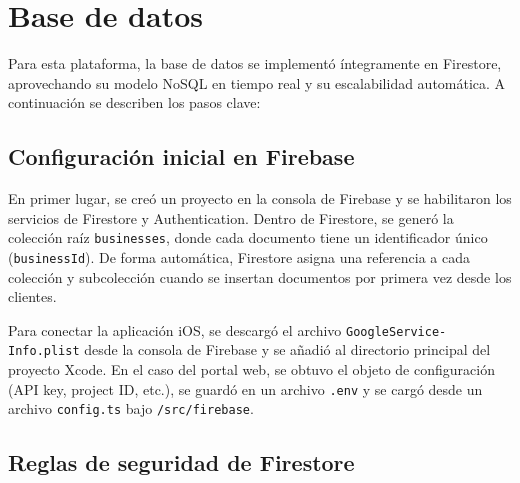 
\section{Base de datos}

\begin{large}

Para esta plataforma, la base de datos se implementó íntegramente en Firestore, aprovechando su modelo NoSQL en tiempo real y su escalabilidad automática. A continuación se describen los pasos clave:

\end{large}

\subsection{Configuración inicial en Firebase}

\begin{large}

En primer lugar, se creó un proyecto en la consola de Firebase y se habilitaron los servicios de Firestore y Authentication. Dentro de Firestore, se generó la colección raíz \texttt{businesses}, donde cada documento tiene un identificador único (\texttt{businessId}). De forma automática, Firestore asigna una referencia a cada colección y subcolección cuando se insertan documentos por primera vez desde los clientes.

Para conectar la aplicación iOS, se descargó el archivo \texttt{GoogleService-Info.plist} desde la consola de Firebase y se añadió al directorio principal del proyecto Xcode. En el caso del portal web, se obtuvo el objeto de configuración (API key, project ID, etc.), se guardó en un archivo \texttt{.env} y se cargó desde un archivo \texttt{config.ts} bajo \texttt{/src/firebase}.

\end{large}

\subsection{Reglas de seguridad de Firestore}

